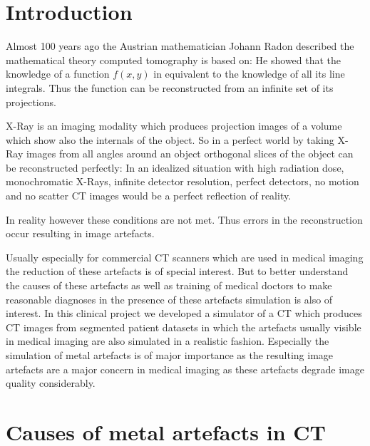 \chapter{Introduction}
\par Almost 100 years ago the Austrian mathematician Johann Radon described the mathematical theory computed tomography is based on: He showed that the knowledge of a function \(f(x,y)\) in equivalent to the knowledge of all its line integrals. Thus the function can be reconstructed from an infinite set of its projections.
\par X-Ray is an imaging modality which produces projection images of a volume which show also the internals of the object. So in a perfect world by taking X-Ray images from all angles around an object orthogonal slices of the object can be reconstructed perfectly: In an idealized situation with high radiation dose, monochromatic X-Rays, infinite detector resolution, perfect detectors, no motion and no scatter CT images would be a perfect reflection of reality.\cite{CausesAndReductionTechniques}
\par In reality however these conditions are not met. Thus errors in the reconstruction occur resulting in image artefacts.
\par Usually especially for commercial CT scanners which are used in medical imaging the reduction of these artefacts is of special interest. But to better understand the causes of these artefacts as well as training of medical doctors to make reasonable diagnoses in the presence of these artefacts simulation is also of interest. In this clinical project we developed a simulator of a CT which produces CT images from segmented patient datasets in which the artefacts usually visible in medical imaging are also simulated in a realistic fashion. Especially the simulation of metal artefacts is of major importance as the resulting image artefacts are a major concern in medical imaging as these artefacts degrade image quality considerably.

\chapter{Causes of metal artefacts in CT}
